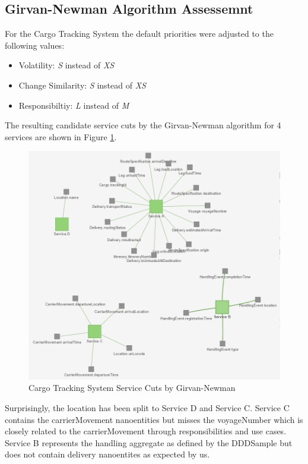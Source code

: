 \subsection{Girvan-Newman Algorithm Assessemnt}

For the Cargo Tracking System the default priorities were adjusted to the following values:

\begin{itemize}
	\item Volatility: \textit{S} instead of \textit{XS}
	\item Change Similarity: \textit{S} instead of \textit{XS}
	\item Responsibiltiy: \textit{L} instead of \textit{M}
\end{itemize}

The resulting candidate service cuts by the Girvan-Newman algorithm for 4 services are shown in Figure \ref{fig:dddGirvanNewman}.

\begin{figure}[H]
	\includegraphics[scale=0.7]{images/ddd_girvan_4.png}
	\caption{Cargo Tracking System Service Cuts by Girvan-Newman}
	\label{fig:dddGirvanNewman}
\end{figure}

Surprisingly, the location has been split to Service D and Service C. Service C contains the carrierMovement nanoentities but misses the voyageNumber which is closely related to the carrierMovement through responsibilities and use cases. Service B represents the handling aggregate as defined by the DDDSample but does not contain delivery nanoentites as expected by us. 

